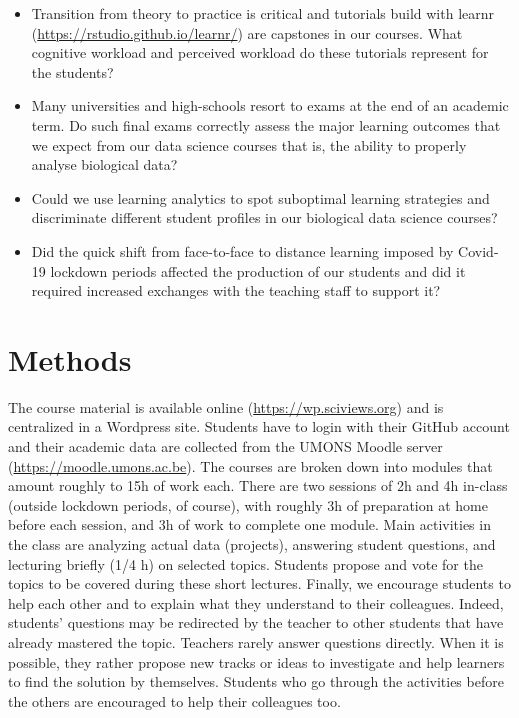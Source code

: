 \documentclass{aims}
\theoremstyle{definition}
\begin{document}
\begin{itemize}
\item
  Transition from theory to practice is critical and tutorials build
  with learnr (\url{https://rstudio.github.io/learnr/}) are capstones in
  our courses. What cognitive workload and perceived workload do these
  tutorials represent for the students?
\item
  Many universities and high-schools resort to exams at the end of an
  academic term. Do such final exams correctly assess the major learning
  outcomes that we expect from our data science courses that is, the
  ability to properly analyse biological data?
\item
  Could we use learning analytics to spot suboptimal learning strategies
  and discriminate different student profiles in our biological data
  science courses?
\item
  Did the quick shift from face-to-face to distance learning imposed by
  Covid-19 lockdown periods affected the production of our students and
  did it required increased exchanges with the teaching staff to support
  it?
\end{itemize}

\hypertarget{methods}{%
\section{Methods}\label{methods}}

The course material is available online (\url{https://wp.sciviews.org})
and is centralized in a Wordpress site. Students have to login with
their GitHub account and their academic data are collected from the
UMONS Moodle server (\url{https://moodle.umons.ac.be}). The courses are
broken down into modules that amount roughly to 15h of work each. There
are two sessions of 2h and 4h in-class (outside lockdown periods, of
course), with roughly 3h of preparation at home before each session, and
3h of work to complete one module. Main activities in the class are
analyzing actual data (projects), answering student questions, and
lecturing briefly (1/4 h) on selected topics. Students propose and vote
for the topics to be covered during these short lectures. Finally, we
encourage students to help each other and to explain what they
understand to their colleagues. Indeed, students' questions may be
redirected by the teacher to other students that have already mastered
the topic. Teachers rarely answer questions directly. When it is
possible, they rather propose new tracks or ideas to investigate and
help learners to find the solution by themselves. Students who go
through the activities before the others are encouraged to help their
colleagues too.
\end{document}
